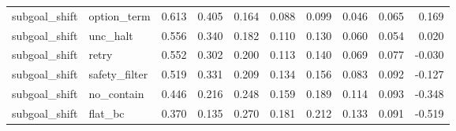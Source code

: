 \documentclass{article}
\begin{document}
\begin{longtable}{@{}llrrrrrrrr@{}}
subgoal\_shift & option\_term & 0.613 & 0.405 & 0.164 & 0.088 & 0.099 & 0.046 & 0.065 & 0.169 \\
subgoal\_shift & unc\_halt & 0.556 & 0.340 & 0.182 & 0.110 & 0.130 & 0.060 & 0.054 & 0.020 \\
subgoal\_shift & retry & 0.552 & 0.302 & 0.200 & 0.113 & 0.140 & 0.069 & 0.077 & -0.030 \\
subgoal\_shift & safety\_filter & 0.519 & 0.331 & 0.209 & 0.134 & 0.156 & 0.083 & 0.092 & -0.127 \\
subgoal\_shift & no\_contain & 0.446 & 0.216 & 0.248 & 0.159 & 0.189 & 0.114 & 0.093 & -0.348 \\
subgoal\_shift & flat\_bc & 0.370 & 0.135 & 0.270 & 0.181 & 0.212 & 0.133 & 0.091 & -0.519 \\
\bottomrule
\end{longtable}
\end{document}
